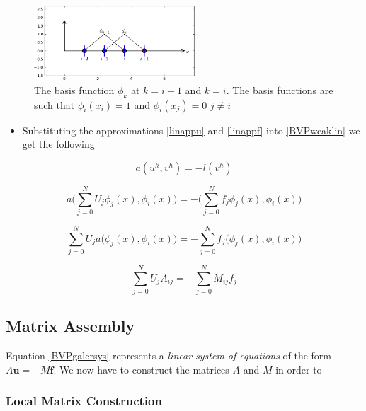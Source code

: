 \documentclass[12pt]{report}
\begin{document}
\begin{figure}[h!]\label{hatfunc}
\begin{center}
\includegraphics[width=60mm]{hatfunction.png}
\caption{The basis function $\phi_k$ at $k=i-1$ and $k=i$. The basis functions are such that $\phi_i(x_i)=1$ and $\phi_i(x_j)=0$ $j\neq{i}$}
\end{center}
\end{figure}

\begin{itemize}
\item Substituting the approximations \eqref{linappu} and \eqref{linappf} into \eqref{BVPweaklin} we get the following 
\end{itemize}

\begin{equation}\label{BVPgaler}
a(u^h,v^h)=-l(v^h)
\end{equation}

\begin{equation}
a\Bigg(\sum^{N}_{j=0}{U}_{j}\phi_j(x),\phi_i(x)\Bigg)=-\Bigg(\sum^{N}_{j=0}f_j\phi_j(x),\phi_i(x)\Bigg)
\end{equation}

\begin{equation}\label{BVPgaler}
\sum^{N}_{j=0}{U}_{j}a\Bigg(\phi_j(x),\phi_i(x)\Bigg)=-\sum^{N}_{j=0}f_j\Bigg(\phi_j(x),\phi_i(x)\Bigg)
\end{equation}

\begin{equation}\label{BVPgalersys}
\sum^{N}_{j=0}{U}_{j}A_{ij}=-\sum^{N}_{j=0}M_{ij}f_j
\end{equation}


\subsection*{Matrix Assembly}

Equation \eqref{BVPgalersys} represents a \textit{linear system of equations} of the form $A\textbf{u}=-M\textbf{f}$. We now have to construct the matrices $A$ and $M$ in order to 


\subsubsection{Local Matrix Construction}
\end{document}
